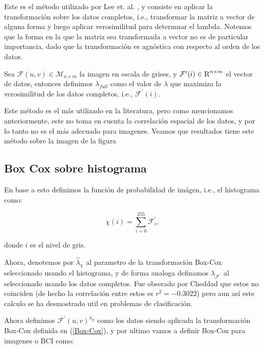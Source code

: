     Este es el m\'etodo utilizado por Lee et. al. \cite{lee2009mr}, y consiste en aplicar la transformaci\'on sobre los datos completos, i.e., transformar la matriz a vector de alguna forma y luego aplicar verosimilitud para determnar el lambda. Notemos que la forma en la que la matriz sea transformada a vector no es de particular importancia, dado que la transformaci\'on es agn\'ostica con respecto al orden de los datos. 

    \begin{defn}
        Sea $\mathcal{F}(u, v)\in\mathcal{M}_{n\times m}$ la imagen en escala de grises, y $\mathcal{F}^{\prime}(i)\in\textsc{R}^{n\times m}$ el vector de datos, entonces definimos $\lambda_{full}$ como el valor de $\lambda$ que maximiza la verosimilitud de los datos completos, i.e., $\mathcal{F}^{\prime}(i)$.
    \end{defn}
    
    Este m\'etodo es el m\'as utilizado en la literatura, pero como mencionamos anteriormente, este no toma en cuenta la correlaci\'on espacial de los datos, y por lo tanto no es el m\'as adecuado para imagenes. Veamos que resultados tiene este m\'etodo sobre la imagen de la figura 

    

     

    \subsection[short]{Box Cox sobre histograma}

    En base a esto definimos la funci\'on de probabilidad de im\'agen, i.e., el histograma como:
    
    $$\chi(i)=\sum_{i=0}^{255}\mathcal{F}^{\prime}_i,$$

    donde $i$ es el nivel de gris.
    
    Ahora, denotemos por $\hat{\lambda}_{\chi}$ al parametro de la transformaci\'on Box-Cox seleccionado usando el histograma, y de forma analoga definamos $\lambda_{\mathcal{F}^{\prime}}$ al seleccionado usando los datos completos. Fue obserado por Cheddad que estos no coinciden (de hecho la correlaci\'on entre estos es $r^2=-0.3022$) pero aun as\'i este calculo se ha desmostrado util en problemas de clasificaci\'on.

    Ahora definimos $\mathcal{F}^{\prime}(u, v)^{\lambda_{\chi}}$ como los datos siendo aplicada la transformaci\'on Box-Cox definida en (\ref{Box-Cox}), y por ultimo vamos a definir Box-Cox para imagenes o BCI como:

